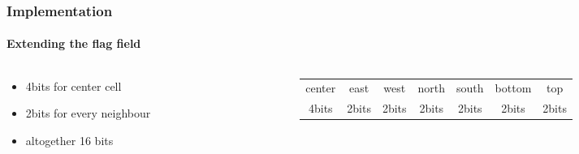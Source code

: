\documentclass{beamer}
\begin{document}
\begin{frame}
\frametitle{Implementation}
\framesubtitle{Extending the flag field}
\begin{columns}
\begin{column}{0.46\textwidth}
\begin{itemize}
\item 4bits for center cell
\item 2bits for every neighbour
\item altogether 16 bits
\end{itemize}
\end{column}
\begin{column}{0.46\textwidth}
\begin{table}[hb!]
\label{tab4}
\centering
\begin{tabular}{|c||c|c|c|c|c|c|}
\hline
center & east & west & north & south & bottom & top \\ 
4bits & 2bits & 2bits & 2bits & 2bits & 2bits & 2bits\\
\hline
\end{tabular}
\end{table} 
\end{column}
\end{columns}
\end{frame}
\end{document}
